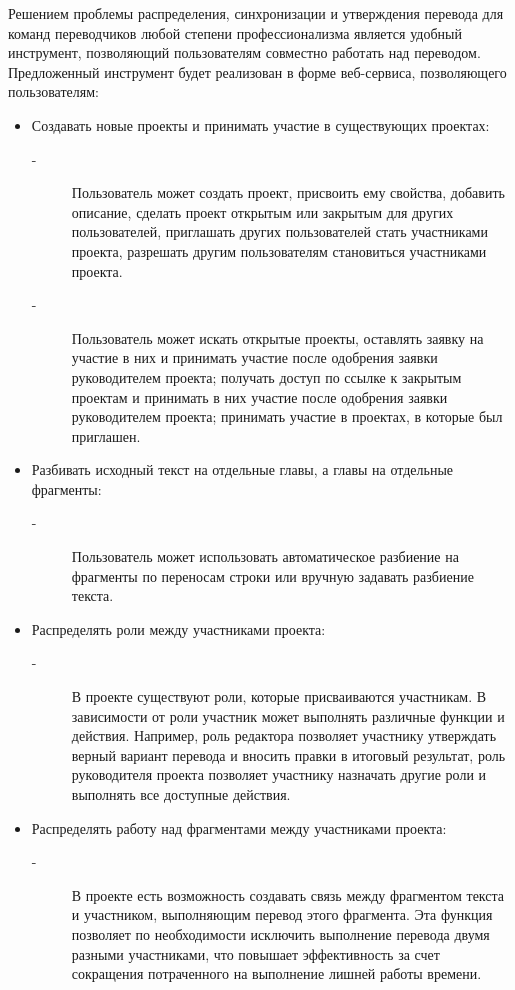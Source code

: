 \documentclass[a4paper,12pt]{article}
\begin{document}
Решением проблемы распределения, синхронизации и утверждения перевода для команд переводчиков любой степени профессионализма является удобный инструмент, позволяющий пользователям совместно работать над переводом.\\
Предложенный инструмент будет реализован в форме веб-сервиса, позволяющего пользователям:
\begin{itemize}
	\item Создавать новые проекты и принимать участие в существующих проектах:
	\begin{description}
		\item[-] Пользователь может создать проект, присвоить ему свойства, добавить описание, сделать проект открытым или закрытым для других пользователей, приглашать других пользователей стать участниками проекта, разрешать другим пользователям становиться участниками проекта.
		\item[-] Пользователь может искать открытые проекты, оставлять заявку на участие в них и принимать участие после одобрения заявки руководителем проекта; получать доступ по ссылке к закрытым проектам и принимать в них участие после одобрения заявки руководителем проекта; принимать участие в проектах, в которые был приглашен.
	\end{description}
	\item Разбивать исходный текст на отдельные главы, а главы на отдельные фрагменты:
	\begin{description}
		\item[-] Пользователь может использовать автоматическое разбиение на фрагменты по переносам строки или вручную задавать разбиение текста.
	\end{description}
	\item Распределять роли между участниками проекта:
	\begin{description}
		\item[-] В проекте существуют роли, которые присваиваются участникам. В зависимости от роли участник может выполнять различные функции и действия. Например, роль редактора позволяет участнику утверждать верный вариант перевода и вносить правки в итоговый результат, роль руководителя проекта позволяет участнику назначать другие роли и выполнять все доступные действия.
	\end{description}
	\item Распределять работу над фрагментами между участниками проекта:
	\begin{description}
		\item[-] В проекте есть возможность создавать связь между фрагментом текста и участником, выполняющим перевод этого фрагмента. Эта функция позволяет по необходимости исключить выполнение перевода двумя разными участниками, что повышает эффективность за счет сокращения потраченного на выполнение лишней работы времени.

\end{description}
\end{itemize}
\end{document}
